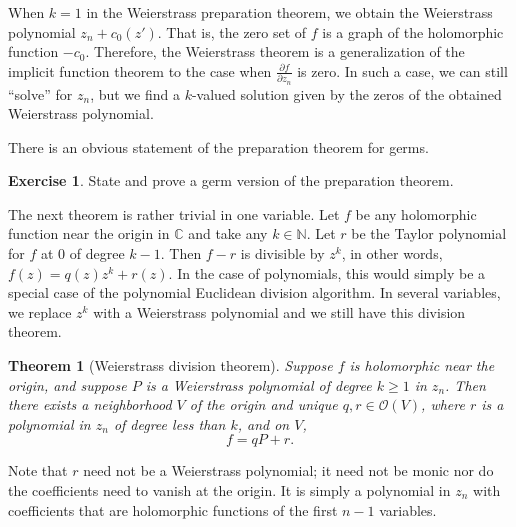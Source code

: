 \documentclass[12pt,openany]{book}
\newcommand{\C}{{\mathbb{C}}}
\newcommand{\N}{{\mathbb{N}}}
\newcommand{\sO}{{\mathscr{O}}}
\newcommand{\myindex}[1]{#1\index{#1}}
\theoremstyle{plain}
\newtheorem{thm}{Theorem}[section]
\theoremstyle{remark}
\theoremstyle{definition}
\newenvironment{exbox}{%
    \def\FrameCommand{\vrule width 1pt \relax\hspace{10pt}}%
    \MakeFramed{\advance\hsize-\width\FrameRestore}%
}{%
    \endMakeFramed
}
\theoremstyle{exercise}
\newtheorem{exercise}{Exercise}[section]
\theoremstyle{example}
\begin{document}
When $k=1$ in the Weierstrass preparation theorem, we obtain
the Weierstrass polynomial $z_n + c_0(z')$.  That is, the zero set of
$f$ is a graph of the holomorphic function $-c_0$.
Therefore, the Weierstrass theorem is a generalization of the
implicit function theorem to the case when $\frac{\partial f}{\partial z_n}$
is zero.  In such a case, we can still ``solve'' for $z_n$,
but we find a $k$-valued solution given by the zeros of the obtained Weierstrass polynomial.

There is an obvious statement of the preparation theorem for germs.

\begin{exbox}
\begin{exercise}
State and prove a germ version of the preparation theorem.
\end{exercise}
\end{exbox}

The next theorem is rather trivial in one variable.  Let $f$ be any
holomorphic function near the origin in $\C$ and take any $k \in \N$.
Let $r$ be the Taylor polynomial for $f$ at $0$ of degree $k-1$.  Then
$f-r$ is divisible by $z^k$, in other words, 
$f(z) = q(z) z^k + r(z)$.
In the case of polynomials, this would simply be a special case of
the polynomial Euclidean division algorithm.
In several variables, we replace
$z^k$ with a Weierstrass polynomial and we still have this division
theorem.

\begin{thm}[\myindex{Weierstrass division theorem}]
Suppose $f$ is holomorphic near the origin, and suppose $P$
is a Weierstrass polynomial of degree $k \geq 1$ in $z_n$.  Then there exists
a neighborhood $V$ of the origin and unique $q,r \in \sO(V)$,
where $r$ is a polynomial in $z_n$ of degree less than $k$, and on $V$,
\begin{equation*}
f = qP + r .
\end{equation*}
\end{thm}

Note that $r$ need not be a Weierstrass polynomial; it need not be monic
nor do the coefficients need to vanish at the origin.  It is simply a
polynomial in $z_n$ with coefficients that are holomorphic functions
of the first $n-1$ variables.
\end{document}
